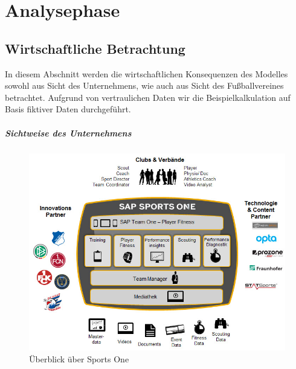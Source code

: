 \chapter{Analysephase}




\section{Wirtschaftliche Betrachtung}
\label{wa}
In diesem Abschnitt werden die wirtschaftlichen Konsequenzen des Modelles sowohl aus Sicht des Unternehmens, wie auch aus Sicht des Fußballvereines betrachtet.\enlargethispage{2\baselineskip}  Aufgrund von vertraulichen Daten wir die Beispielkalkulation auf Basis fiktiver Daten durchgeführt.

\paragraph{Sichtweise des Unternehmens}

\begin{figure}[H]
\centering
\includegraphics[scale=0.575]{se-wa-jpg/sportsone}
\caption{Überblick über Sports One}
\label{sportsone}
\end{figure}

